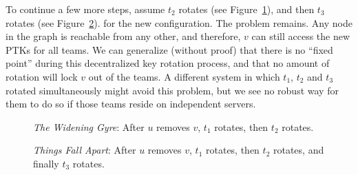 To continue a few more steps, assume $t_2$ rotates (see Figure~\ref{fig:cycle3}), 
and then $t_3$ rotates (see Figure~\ref{fig:cycle4}).
for the new configuration. The problem remains. Any node in the graph is reachable from any other,
and therefore, $v$ can still access the new PTKs for all teams. We can generalize (without proof)
that there is no ``fixed point'' during this decentralized key rotation process, and that no amount
of rotation will lock $v$ out of the teams. A different system in which $t_1$, $t_2$ and $t_3$
rotated simultaneously might avoid this problem, but we see no robust way for them to do so 
if those teams reside on independent servers.

\begin{figure}[ht]
    \centering
    \caption{\textit{The Widening Gyre}: After $u$ removes $v$, $t_1$ rotates, then $t_2$ rotates.}
    \label{fig:cycle3}
\end{figure}

\begin{figure}[ht]
    \centering
    \caption{\textit{Things Fall Apart}: After $u$ removes $v$, $t_1$ rotates, then $t_2$ rotates, and finally $t_3$ rotates.}
    \label{fig:cycle4}
\end{figure}

